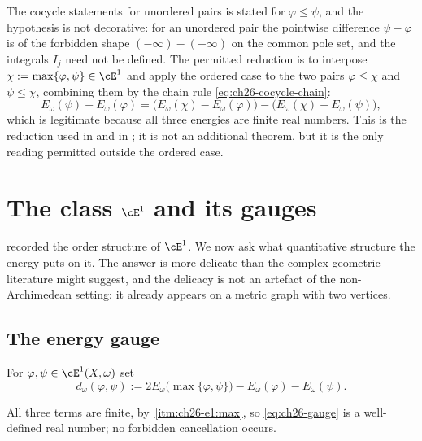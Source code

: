 \begin{warning}{The cocycle statements for unordered pairs}
 is stated for \(\varphi\leq\psi\), and the
hypothesis is not decorative: for an unordered pair the pointwise difference
\(\psi-\varphi\) is of the forbidden shape \((-\infty)-(-\infty)\) on the
common pole set, and the integrals \(I_j\) need not be defined.  The
permitted reduction is to interpose \(\chi:=\max\{\varphi,\psi\}\in\cE^1\)
and apply the ordered case to the two pairs \(\varphi\leq\chi\) and
\(\psi\leq\chi\), combining them by the chain rule
\eqref{eq:ch26-cocycle-chain}:
\[
 E_\omega(\psi)-E_\omega(\varphi)
 =\bigl(E_\omega(\chi)-E_\omega(\varphi)\bigr)
  -\bigl(E_\omega(\chi)-E_\omega(\psi)\bigr),
\]
which is legitimate because all three energies are finite real numbers.  This
is the reduction used in  and in
; it is not an additional theorem, but
it is the only reading permitted outside the ordered case.
\end{warning}

\section{The class \texorpdfstring{\(\cE^1\)}{E1} and its gauges}
\label{sec:ch26-e1-gauge}

 recorded the order structure of \(\cE^1\).  We
now ask what quantitative structure the energy puts on it.  The answer is
more delicate than the complex-geometric literature might suggest, and the
delicacy is not an artefact of the non-Archimedean setting: it already
appears on a metric graph with two vertices.

\subsection{The energy gauge}
\label{sec:ch26-gauge}

\begin{definition}
\label{def:ch26-gauge}
For \(\varphi,\psi\in\cE^1(X,\omega)\) set
\begin{equation}
\label{eq:ch26-gauge}
 d_\omega(\varphi,\psi)
 :=2E_\omega\bigl(\max\{\varphi,\psi\}\bigr)
   -E_\omega(\varphi)-E_\omega(\psi).
\end{equation}
\end{definition}

All three terms are finite, by
\,\cref{itm:ch26-e1:max}, so
\eqref{eq:ch26-gauge} is a well-defined real number; no forbidden
cancellation occurs.

